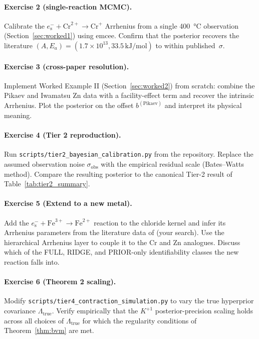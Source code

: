 \documentclass[12pt]{article}
\theoremstyle{plain}
\theoremstyle{definition}
\theoremstyle{remark}
\newcommand{\eS}{\ensuremath{e_{\mathrm{s}}^{-}}\xspace}
\begin{document}
\paragraph{Exercise 2 (single-reaction MCMC).}
Calibrate the $\eS+\mathrm{Cr}^{2+}\to\mathrm{Cr}^+$ Arrhenius from a
single \SI{400}{\celsius} observation (Section~\ref{sec:worked1}) using
emcee.  Confirm that the posterior recovers the literature
$(A, E_a) = (1.7\times 10^{13}, 33.5\,\mathrm{kJ/mol})$ to within
published~$\sigma$.

\paragraph{Exercise 3 (cross-paper resolution).}
Implement Worked Example II (Section~\ref{sec:worked2}) from scratch:
combine the Pikaev and Iwamatsu Zn data with a facility-effect term and
recover the intrinsic Arrhenius.  Plot the posterior on the offset
$b^{(\mathrm{Pikaev})}$ and interpret its physical meaning.

\paragraph{Exercise 4 (Tier 2 reproduction).}
Run \texttt{scripts/tier2\_bayesian\_calibration.py} from the repository.
Replace the assumed observation noise $\sigma_{\mathrm{obs}}$ with the
empirical residual scale (Bates--Watts method).  Compare the resulting
posterior to the canonical Tier-2 result of Table~\ref{tab:tier2_summary}.

\paragraph{Exercise 5 (Extend to a new metal).}
Add the $\eS+\mathrm{Fe}^{3+}\to\mathrm{Fe}^{2+}$ reaction to the
chloride kernel and infer its Arrhenius parameters from the literature
data of (your search).  Use the hierarchical Arrhenius layer to couple it
to the Cr and Zn analogues.  Discuss which of the FULL, RIDGE, and
PRIOR-only identifiability classes the new reaction falls into.

\paragraph{Exercise 6 (Theorem 2 scaling).}
Modify \texttt{scripts/tier4\_contraction\_simulation.py} to vary the
true hyperprior covariance $\Lambda_{\mathrm{true}}$.  Verify empirically
that the $K^{+1}$ posterior-precision scaling holds across all
choices of $\Lambda_{\mathrm{true}}$ for which the regularity conditions
of Theorem~\ref{thm:bvm} are met.



\end{document}
